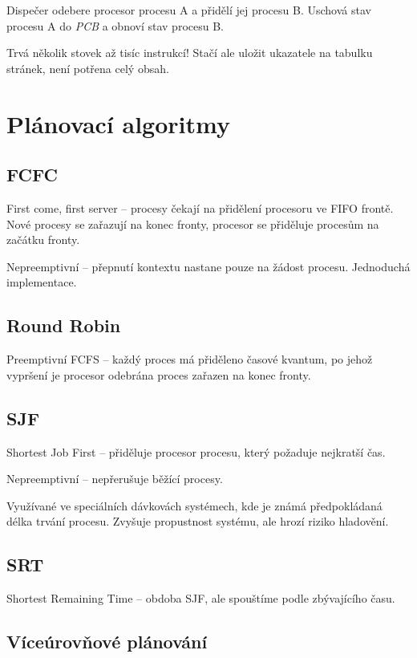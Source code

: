 \documentclass[a4wide]{report}
\begin{document}
Dispečer odebere procesor procesu A a přidělí jej procesu B. Uschová stav procesu A do \emph{PCB} a obnoví stav procesu B.

Trvá několik stovek až tisíc instrukcí! Stačí ale uložit ukazatele na tabulku stránek, není potřena celý obsah.

\section{Plánovací algoritmy}

\subsection{FCFC}
First come, first server -- procesy čekají na přidělení procesoru ve FIFO frontě. Nové procesy se zařazují na konec fronty, procesor se přiděluje procesům na začátku fronty.

Nepreemptivní -- přepnutí kontextu nastane pouze na žádost procesu. Jednoduchá implementace.

\subsection{Round Robin}

Preemptivní FCFS -- každý proces má přiděleno časové kvantum, po jehož vypršení je procesor odebrána  proces zařazen na konec fronty.

\subsection{SJF}

Shortest Job First -- přiděluje procesor procesu, který požaduje nejkratší čas.

Nepreemptivní -- nepřerušuje běžící procesy.

Využívané ve speciálních dávkovách systémech, kde je známá předpokládaná délka trvání procesu. Zvyšuje propustnost systému, ale hrozí riziko hladovění.

\subsection{SRT}

Shortest Remaining Time -- obdoba SJF, ale spouštíme podle zbývajícího času.

\subsection{Víceúrovňové plánování}
\end{document}
